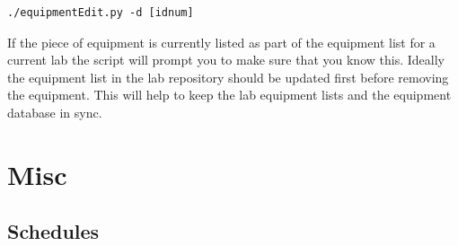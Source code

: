 \documentclass[justified]{book}
\begin{document}

\begin{lstlisting}
./equipmentEdit.py -d [idnum]       
\end{lstlisting}

If the piece of equipment is currently listed as part of the equipment list for a current lab the script will prompt you to make sure that you know this. Ideally the equipment list in the lab repository should be updated first before removing the equipment. This will help to keep the lab equipment lists and the equipment database in sync. 

\chapter{Misc}

\section{Schedules}
\end{document}
